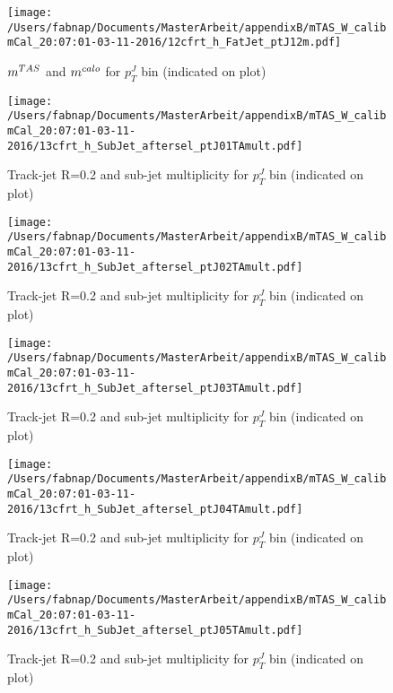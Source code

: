 \begin{figure}
 
\texttt{[image: /Users/fabnap/Documents/MasterArbeit/appendixB/mTAS\_W\_calibmCal\_20:07:01-03-11-2016/12cfrt\_h\_FatJet\_ptJ12m.pdf]}
\caption{$m^{TAS}$ and $m^{calo}$ for $p_{T}^{J}$ bin (indicated on plot) }
 
\end{figure}
\clearpage %
\begin{figure}
 
\texttt{[image: /Users/fabnap/Documents/MasterArbeit/appendixB/mTAS\_W\_calibmCal\_20:07:01-03-11-2016/13cfrt\_h\_SubJet\_aftersel\_ptJ01TAmult.pdf]}
\caption{Track-jet R=0.2 and sub-jet multiplicity for $p_{T}^{J}$ bin (indicated on plot) }
 
\end{figure}
 
\begin{figure}
 
\texttt{[image: /Users/fabnap/Documents/MasterArbeit/appendixB/mTAS\_W\_calibmCal\_20:07:01-03-11-2016/13cfrt\_h\_SubJet\_aftersel\_ptJ02TAmult.pdf]}
\caption{Track-jet R=0.2 and sub-jet multiplicity for $p_{T}^{J}$ bin (indicated on plot) }
 
\end{figure}
 
\begin{figure}
 
\texttt{[image: /Users/fabnap/Documents/MasterArbeit/appendixB/mTAS\_W\_calibmCal\_20:07:01-03-11-2016/13cfrt\_h\_SubJet\_aftersel\_ptJ03TAmult.pdf]}
\caption{Track-jet R=0.2 and sub-jet multiplicity for $p_{T}^{J}$ bin (indicated on plot) }
 
\end{figure}
 
\begin{figure}
 
\texttt{[image: /Users/fabnap/Documents/MasterArbeit/appendixB/mTAS\_W\_calibmCal\_20:07:01-03-11-2016/13cfrt\_h\_SubJet\_aftersel\_ptJ04TAmult.pdf]}
\caption{Track-jet R=0.2 and sub-jet multiplicity for $p_{T}^{J}$ bin (indicated on plot) }
 
\end{figure}
 
\begin{figure}
 
\texttt{[image: /Users/fabnap/Documents/MasterArbeit/appendixB/mTAS\_W\_calibmCal\_20:07:01-03-11-2016/13cfrt\_h\_SubJet\_aftersel\_ptJ05TAmult.pdf]}
\caption{Track-jet R=0.2 and sub-jet multiplicity for $p_{T}^{J}$ bin (indicated on plot) }
 
\end{figure}
 
